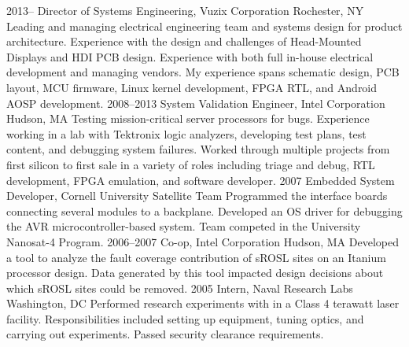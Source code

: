 \documentclass[]{friggeri-cv}
\begin{document}
\begin{entrylist}
  \entry
    {2013--}
    {Director of Systems Engineering, Vuzix Corporation}
    {Rochester, NY}
    {Leading and managing electrical engineering team and systems design for product architecture. Experience with the design and challenges of Head-Mounted Displays and HDI PCB design. Experience with both full in-house electrical development and managing vendors. My experience spans schematic design, PCB layout, MCU firmware, Linux kernel development, FPGA RTL, and Android AOSP development.}
  \entry
    {2008--2013}
    {System Validation Engineer, Intel Corporation}
    {Hudson, MA}
    {Testing mission-critical server processors for bugs. Experience working in a lab with Tektronix logic analyzers, developing test plans, test content, and debugging system failures. Worked through multiple projects from first silicon to first sale in a variety of roles including triage and debug, RTL development, FPGA emulation, and software developer.}
  \entry
    {2007}
    {Embedded System Developer, Cornell University Satellite Team}
    {}
    {Programmed the interface boards connecting several modules to a backplane. Developed an OS driver for debugging the AVR microcontroller-based system. Team competed in the University Nanosat-4 Program.}
  \entry
    {2006--2007}
    {Co-op, Intel Corporation}
    {Hudson, MA}
    {Developed a tool to analyze the fault coverage contribution of sROSL sites on an Itanium processor design. Data generated by this tool impacted design decisions about which sROSL sites could be removed.}
    \entry
    {2005}
    {Intern, Naval Research Labs}
    {Washington, DC}
    {Performed research experiments with in a Class 4 terawatt laser facility. Responsibilities included setting up equipment, tuning optics, and carrying out experiments. Passed security clearance requirements.}
\end{entrylist}


\end{document}
